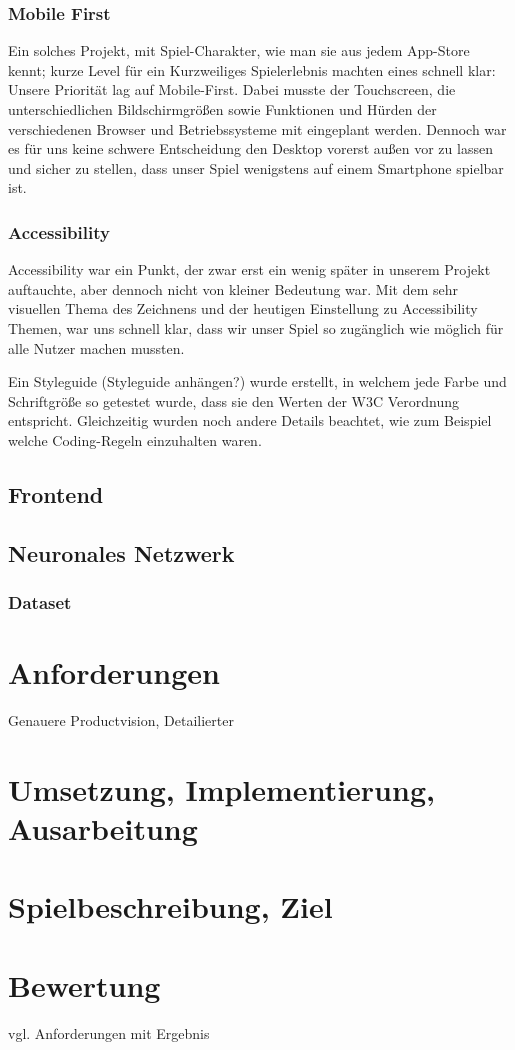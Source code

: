 \documentclass[11pt]{article}
\begin{document}
\subsubsection{Mobile First}

Ein solches Projekt, mit Spiel-Charakter, wie man sie aus jedem App-Store kennt; kurze Level für ein Kurzweiliges Spielerlebnis machten eines schnell klar: Unsere Priorität lag auf Mobile-First. 
Dabei musste der Touchscreen, die unterschiedlichen Bildschirmgrößen sowie Funktionen und Hürden der verschiedenen Browser und Betriebssysteme mit eingeplant werden. Dennoch war es für uns keine schwere Entscheidung den Desktop vorerst außen vor zu lassen und sicher zu stellen, dass unser Spiel wenigstens auf einem Smartphone spielbar ist. 

\subsubsection{Accessibility}

Accessibility war ein Punkt, der zwar erst ein wenig später in unserem Projekt auftauchte, aber dennoch nicht von kleiner Bedeutung war. Mit dem sehr visuellen Thema des Zeichnens und der heutigen Einstellung zu Accessibility Themen, war uns schnell klar, dass wir unser Spiel so zugänglich wie möglich für alle Nutzer machen mussten. 

Ein Styleguide (Styleguide anhängen?) wurde erstellt, in welchem jede Farbe und Schriftgröße so getestet wurde, dass sie den Werten der W3C Verordnung entspricht.
Gleichzeitig wurden noch andere Details beachtet, wie zum Beispiel welche Coding-Regeln einzuhalten waren.


\subsection{Frontend}
\subsection{Neuronales Netzwerk}
\subsubsection{Dataset}
\section{Anforderungen}
Genauere Productvision, Detailierter
\section{Umsetzung, Implementierung, Ausarbeitung}
\section{Spielbeschreibung, Ziel}
\section{Bewertung}
vgl. Anforderungen mit Ergebnis

\printbibliography
\end{document}
